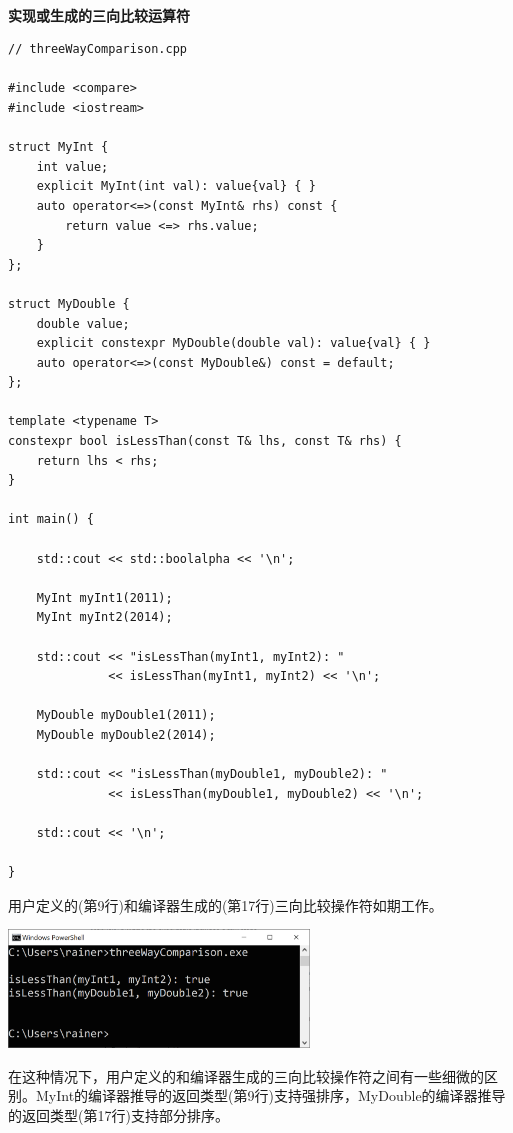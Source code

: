 \hspace*{\fill} \\ %
\noindent
\textbf{实现或生成的三向比较运算符}
\begin{lstlisting}[style=styleCXX]
// threeWayComparison.cpp

#include <compare>
#include <iostream>

struct MyInt {
	int value;
	explicit MyInt(int val): value{val} { }
	auto operator<=>(const MyInt& rhs) const {
		return value <=> rhs.value;
	}
};

struct MyDouble {
	double value;
	explicit constexpr MyDouble(double val): value{val} { }
	auto operator<=>(const MyDouble&) const = default;
};

template <typename T>
constexpr bool isLessThan(const T& lhs, const T& rhs) {
	return lhs < rhs;
}

int main() {

	std::cout << std::boolalpha << '\n';
	
	MyInt myInt1(2011);
	MyInt myInt2(2014);
	
	std::cout << "isLessThan(myInt1, myInt2): "
	          << isLessThan(myInt1, myInt2) << '\n';
	
	MyDouble myDouble1(2011);
	MyDouble myDouble2(2014);
	
	std::cout << "isLessThan(myDouble1, myDouble2): "
	          << isLessThan(myDouble1, myDouble2) << '\n';
	
	std::cout << '\n';

}
\end{lstlisting}

用户定义的(第9行)和编译器生成的(第17行)三向比较操作符如期工作。

\begin{center}
\includegraphics[width=0.6\textwidth]{content/3/chapter4/images/28.png}\\
\end{center}

在这种情况下，用户定义的和编译器生成的三向比较操作符之间有一些细微的区别。MyInt的编译器推导的返回类型(第9行)支持强排序，MyDouble的编译器推导的返回类型(第17行)支持部分排序。

